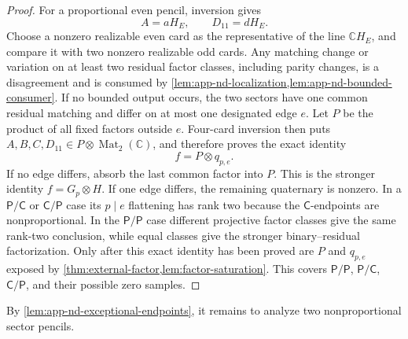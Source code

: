 \documentclass[11pt,letterpaper,onecolumn]{article}
\theoremstyle{plain}
\theoremstyle{definition}
\theoremstyle{remark}
\newcommand{\Mat}{\operatorname{Mat}}
\begin{document}
\begin{proof}
For a proportional even pencil, inversion gives
\begin{equation*}
  A=aH_E,
  \qquad
  D_{11}=dH_E.
\end{equation*}
Choose a nonzero realizable even card as the representative of the line
\(\mathbb C H_E\), and compare it with two nonzero realizable odd cards.  Any
matching change or variation on at least two residual factor classes,
including parity changes, is a disagreement and is consumed by
\cref{lem:app-nd-localization,lem:app-nd-bounded-consumer}.  If no bounded
output occurs, the two sectors have one common residual matching and differ
on at most one designated edge \(e\).  Let \(P\) be the product of all fixed
factors outside \(e\).  Four-card inversion then puts
\(A,B,C,D_{11}\in P\otimes\Mat_2(\mathbb C)\), and therefore proves the exact
identity
\[
 f=P\otimes q_{p,e}.
\]
If no edge differs, absorb the last common factor into \(P\). This is the
stronger identity \(f=G_p\otimes H\).  If one edge differs, the remaining
quaternary is nonzero. In a \(\mathsf{P}/\mathsf{C}\) or \(\mathsf{C}/\mathsf{P}\) case its \(p\mid e\) flattening has
rank two because the \(\mathsf C\)-endpoints are nonproportional.  In the \(\mathsf{P}/\mathsf{P}\)
case different projective factor classes give the same rank-two conclusion, while
equal classes give the stronger binary--residual factorization.  Only after
this exact identity has been proved are \(P\) and \(q_{p,e}\) exposed by
\cref{thm:external-factor,lem:factor-saturation}.  This covers \(\mathsf{P}/\mathsf{P}\),
\(\mathsf{P}/\mathsf{C}\), \(\mathsf{C}/\mathsf{P}\), and their possible zero samples.
\end{proof}

By \cref{lem:app-nd-exceptional-endpoints}, it remains to analyze two
nonproportional sector pencils.
\end{document}

